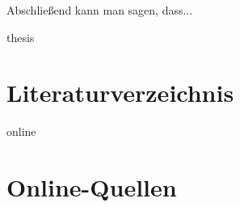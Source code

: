 \documentclass[11pt,a4paper]{report}
\begin{document}
Abschließend kann man sagen, dass...

\newpage


\begin{btSect}{thesis} %
\section*{Literaturverzeichnis}
\btPrintCited
\end{btSect}
\begin{btSect}{online}
\section*{Online-Quellen}
\btPrintCited
\end{btSect}
\end{document}
